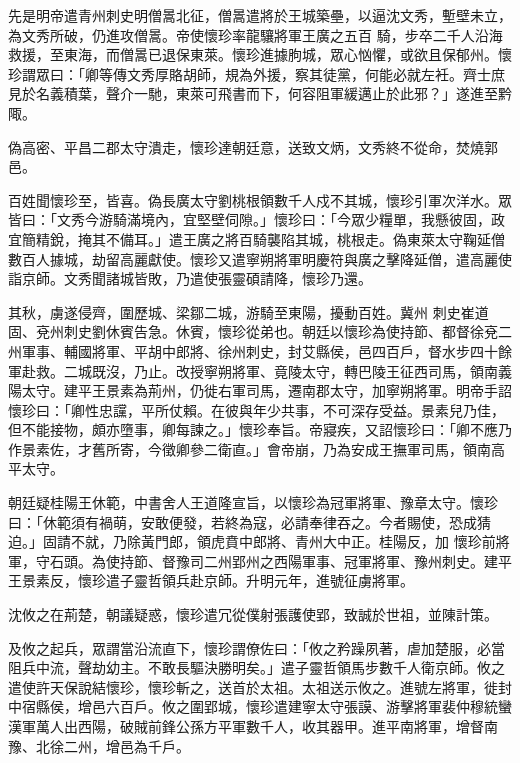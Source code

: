 \begin{pinyinscope}
 先是明帝遣青州刺史明僧暠北征，僧暠遣將於王城築壘，以逼沈文秀，塹壁未立，為文秀所破，仍進攻僧暠。帝使懷珍率龍驤將軍王廣之五百
 騎，步卒二千人沿海救援，至東海，而僧暠已退保東萊。懷珍進據朐城，眾心忷懼，或欲且保郁州。懷珍謂眾曰：「卿等傳文秀厚賂胡師，規為外援，察其徒黨，何能必就左衽。齊士庶見於名義積葉，聲介一馳，東萊可飛書而下，何容阻軍緩邁止於此邪？」遂進至黔陬。



 偽高密、平昌二郡太守潰走，懷珍達朝廷意，送致文炳，文秀終不從命，焚燒郭邑。



 百姓聞懷珍至，皆喜。偽長廣太守劉桃根領數千人戍不其城，懷珍引軍次洋水。眾皆曰：「文秀今游騎滿境內，宜堅壁伺隙。」懷珍曰：「今眾少糧單，我懸彼固，政宜簡精銳，掩其不備耳。」遣王廣之將百騎襲陷其城，桃根走。偽東萊太守鞠延僧數百人據城，劫留高麗獻使。懷珍又遣寧朔將軍明慶符與廣之擊降延僧，遣高麗使詣京師。文秀聞諸城皆敗，乃遣使張靈碩請降，懷珍乃還。



 其秋，虜遂侵齊，圍歷城、梁鄒二城，游騎至東陽，擾動百姓。冀州
 刺史崔道固、兗州刺史劉休賓告急。休賓，懷珍從弟也。朝廷以懷珍為使持節、都督徐兗二州軍事、輔國將軍、平胡中郎將、徐州刺史，封艾縣侯，邑四百戶，督水步四十餘軍赴救。二城既沒，乃止。改授寧朔將軍、竟陵太守，轉巴陵王征西司馬，領南義陽太守。建平王景素為荊州，仍徙右軍司馬，遷南郡太守，加寧朔將軍。明帝手詔懷珍曰：「卿性忠讜，平所仗賴。在彼與年少共事，不可深存受益。景素兒乃佳，但不能接物，頗亦墮事，卿每諫之。」懷珍奉旨。帝寢疾，又詔懷珍曰：「卿不應乃作景素佐，才舊所寄，今徵卿參二衛直。」會帝崩，乃為安成王撫軍司馬，領南高平太守。



 朝廷疑桂陽王休範，中書舍人王道隆宣旨，以懷珍為冠軍將軍、豫章太守。懷珍曰：「休範須有禍萌，安敢便發，若終為寇，必請奉律吞之。今者賜使，恐成猜迫。」固請不就，乃除黃門郎，領虎賁中郎將、青州大中正。桂陽反，加
 懷珍前將軍，守石頭。為使持節、督豫司二州郢州之西陽軍事、冠軍將軍、豫州刺史。建平王景素反，懷珍遣子靈哲領兵赴京師。升明元年，進號征虜將軍。



 沈攸之在荊楚，朝議疑惑，懷珍遣冗從僕射張護使郢，致誠於世祖，並陳計策。



 及攸之起兵，眾謂當沿流直下，懷珍謂僚佐曰：「攸之矜躁夙著，虐加楚服，必當阻兵中流，聲劫幼主。不敢長驅決勝明矣。」遣子靈哲領馬步數千人衛京師。攸之遣使許天保說結懷珍，懷珍斬之，送首於太祖。太祖送示攸之。進號左將軍，徙封中宿縣侯，增邑六百戶。攸之圍郢城，懷珍遣建寧太守張謨、游擊將軍裴仲穆統蠻漢軍萬人出西陽，破賊前鋒公孫方平軍數千人，收其器甲。進平南將軍，增督南豫、北徐二州，增邑為千戶。




\end{pinyinscope}
